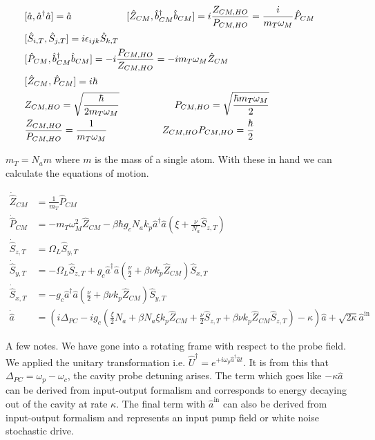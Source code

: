 \documentclass[12pt]{article}
\begin{document}
\begin{align}
&[\hat{a}, \hat{a}^{\dag}\hat{a}] = \hat{a} \hspace{2 cm} 
[\hat{Z}_{CM}, \hat{b}^{\dag}_{CM} \hat{b}_{CM}] = i \frac{Z_{CM,HO}}{P_{CM,HO}} = \frac{i}{m_T \omega_M} \hat{P}_{CM} \\
&[\hat{S}_{i,T},\hat{S}_{j,T}] = i \epsilon_{ijk} \hat{S}_{k,T} \hspace{1 cm}&\\
&[\hat{P}_{CM}, \hat{b}^{\dag}_{CM} \hat{b}_{CM}] = -i \frac{P_{CM,HO}}{Z_{CM,HO}} = -i m_T \omega_M \hat{Z}_{CM}&\\
&[\hat{Z}_{CM},\hat{P}_{CM}] = i\hbar &\\
&Z_{CM,HO} = \sqrt{\frac{\hbar}{2 m_T \omega_M}} \hspace{2cm}
P_{CM,HO} = \sqrt{\frac{\hbar m_T \omega_M}{2}} \hspace{2cm}\\
&\frac{Z_{CM,HO}}{P_{CM,HO}} = \frac{1}{m_T \omega_M} \hspace{2cm}
Z_{CM,HO} P_{CM,HO} = \frac{\hbar}{2}
\end{align}

$m_T = N_a m$ where $m$ is the mass of a single atom. With these in hand we can calculate the equations of motion.

\begin{align}
\dot{\hat{Z}}_{CM} &= \frac{1}{m_T} \hat{P}_{CM} \\
\dot{\hat{P}}_{CM} &= -m_T \omega_M^2 \hat{Z}_{CM} - \beta \hbar g_c N_a k_p \hat{a}^{\dag} \hat{a} \left(\xi + \frac{\nu}{N_a} \hat{S}_{z,T}\right) \\
\dot{\hat{S}}_{z,T} &= \Omega_L \hat{S}_{y,T} \\
\dot{\hat{S}}_{y,T} &= -\Omega_L \hat{S}_{z,T} + g_c \hat{a}^{\dag} \hat{a} \left( \frac{\nu}{2} + \beta \nu k_p \hat{Z}_{CM}\right) \hat{S}_{x,T} \\
\dot{\hat{S}}_{x,T} &= -g_c \hat{a}^{\dag} \hat{a} \left( \frac{\nu}{2} + \beta \nu k_p \hat{Z}_{CM}\right) \hat{S}_{y,T} \\
\dot{\hat{a}} &= \left( i\Delta_{PC} - i g_c \left( \frac{\xi}{2}N_a + \beta N_a \xi k_p \hat{Z}_{CM} + \frac{\nu}{2} \hat{S}_{z,T} + \beta \nu k_p \hat{Z}_{CM} \hat{S}_{z,T} \right) - \kappa \right)\hat{a} + \sqrt{2\kappa} \hat{a}^{\text{in}} 
\end{align}

A few notes. We have gone into a rotating frame with respect to the probe field. We applied the unitary transformation i.e. $\hat{U}^{\dag} = e^{+i \omega_p \hat{a}^{\dag} \hat{a} t}$. It is from this that $\Delta_{PC} = \omega_p - \omega_c$, the cavity probe detuning arises. The term which goes like $-\kappa \hat{a}$ can be derived from input-output formalism and corresponds to energy decaying out of the cavity at rate $\kappa$. The final term with $\hat{a}^{\text{in}}$ can also be derived from input-output formalism and represents an input pump field or white noise stochastic drive.
\end{document}
